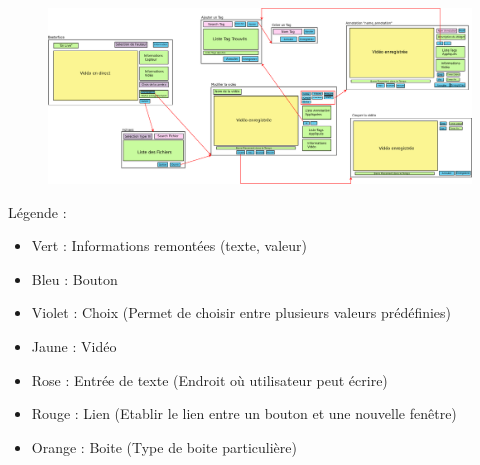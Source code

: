 \documentclass[11pt,french,a4paper]{report}
\begin{document}
\begin{landscape}
\begin{figure}[!h]
\begin{center}
\includegraphics[scale=0.32]{../images/dia/schema_interface.png}
\end{center}
\end{figure}

\Large Légende : \normalsize \\ 
    \begin{multicols}{2}
        \begin{itemize}[label=, leftmargin=*,parsep=0cm,itemsep=0cm,topsep=0cm]
        \item Vert : Informations remontées (texte, valeur)
        \item Bleu : Bouton
        \item Violet : Choix (Permet de choisir entre plusieurs valeurs prédéfinies)
        \item Jaune : Vidéo
        \item Rose : Entrée de texte (Endroit où utilisateur peut écrire)
        \item Rouge : Lien (Etablir le lien entre un bouton et une nouvelle fenêtre)
        \item Orange : Boite (Type de boite particulière)
    \end{itemize}
    \end{multicols}
\end{landscape}
    \setlength{\columnseprule}{0,1}
\end{document}
